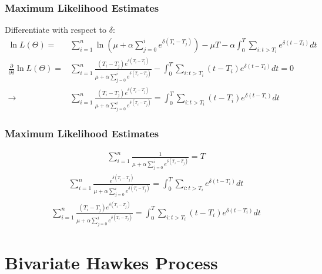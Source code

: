 \documentclass{beamer}
\begin{document}
\begin{frame}
\frametitle{Maximum Likelihood Estimates}
Differentiate with respect to $\delta$:
\begin{equation*}
\begin{split}
\ln L(\Theta) = & \sum_{i=1}^n \ln (\mu + \alpha \sum_{j=0}^i  e^{\delta (T_i - T_j)}) - \mu T - \alpha \int_{0}^{T}  \sum_{i: t>T_i} e^{\delta (t - T_i)} dt \\
\frac{\partial}{\partial \delta} \ln L(\Theta) =& \sum_{i=1}^n \frac{(T_i - T_j)e^{\delta (T_i - T_j)}}{\mu + \alpha \sum_{j=0}^i e^{\delta (T_i - T_j)}} - \int_{0}^{T}  \sum_{i: t>T_i} (t - T_i)e^{\delta (t - T_i)} dt= 0\\
\to& \sum_{i=1}^n \frac{(T_i - T_j)e^{\delta (T_i - T_j)}}{\mu + \alpha \sum_{j=0}^i e^{\delta (T_i - T_j)}} = \int_{0}^{T}  \sum_{i: t>T_i} (t - T_i)e^{\delta (t - T_i)} dt
\end{split}
\end{equation*}
\end{frame}

\begin{frame}
\frametitle{Maximum Likelihood Estimates}
\begin{equation}
\begin{split}
&\sum_{i=1}^n \frac{1}{\mu + \alpha \sum_{j=0}^i e^{\delta (T_i - T_j)}} = T
\end{split}
\end{equation}
\begin{equation}
\begin{split}
& \sum_{i=1}^n \frac{e^{\delta (T_i - T_j)}}{\mu + \alpha \sum_{j=0}^i e^{\delta (T_i - T_j)}} = \int_{0}^{T}  \sum_{i: t>T_i} e^{\delta (t - T_i)} dt
\end{split}
\end{equation}
\begin{equation}
\begin{split}
&\sum_{i=1}^n \frac{(T_i - T_j)e^{\delta (T_i - T_j)}}{\mu + \alpha \sum_{j=0}^i e^{\delta (T_i - T_j)}} = \int_{0}^{T}  \sum_{i: t>T_i} (t - T_i)e^{\delta (t - T_i)} dt
\end{split}
\end{equation}
\end{frame}

\section{Bivariate Hawkes Process}
\end{document}
